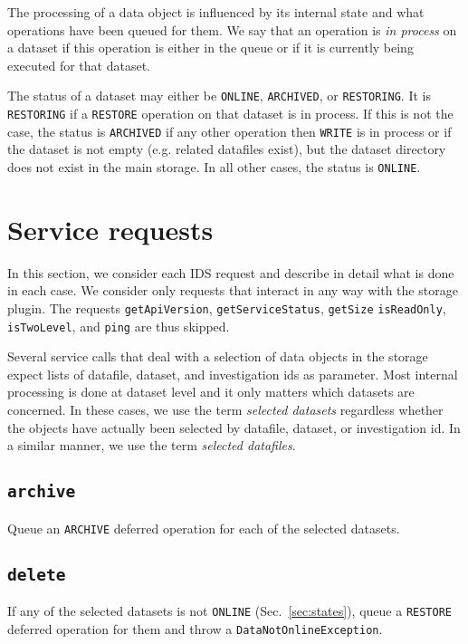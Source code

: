 \documentclass[paper=a4]{scrartcl}
\begin{document}
The processing of a data object is influenced by its internal state
and what operations have been queued for them.  We say that an
operation is \emph{in process} on a dataset if this operation is
either in the queue or if it is currently being executed for that
dataset.

The status of a dataset may either be \texttt{ONLINE},
\texttt{ARCHIVED}, or \texttt{RESTORING}.  It is \texttt{RESTORING} if
a \texttt{RESTORE} operation on that dataset is in process.  If this
is not the case, the status is \texttt{ARCHIVED} if any other
operation then \texttt{WRITE} is in process or if the dataset is not
empty (e.g. related datafiles exist), but the dataset directory does
not exist in the main storage.  In all other cases, the status is
\texttt{ONLINE}.


\section{Service requests}
\label{sec:requests}

In this section, we consider each IDS request and describe in detail
what is done in each case.  We consider only requests that interact in
any way with the storage plugin.  The requests \texttt{getApiVersion},
\texttt{getServiceStatus}, \texttt{getSize} \texttt{isReadOnly},
\texttt{isTwoLevel}, and \texttt{ping} are thus skipped.

Several service calls that deal with a selection of data objects in
the storage expect lists of datafile, dataset, and investigation ids
as parameter.  Most internal processing is done at dataset level and
it only matters which datasets are concerned.  In these cases, we use
the term \emph{selected datasets} regardless whether the objects have
actually been selected by datafile, dataset, or investigation id.  In
a similar manner, we use the term \emph{selected datafiles}.

\subsection{\texttt{archive}}

Queue an \texttt{ARCHIVE} deferred operation for each of the selected
datasets.

\subsection{\texttt{delete}}
\label{sec:requests:delete}

If any of the selected datasets is not \texttt{ONLINE}
(Sec.\ \ref{sec:states}), queue a \texttt{RESTORE} deferred operation
for them and throw a \texttt{DataNotOnlineException}.
\end{document}
